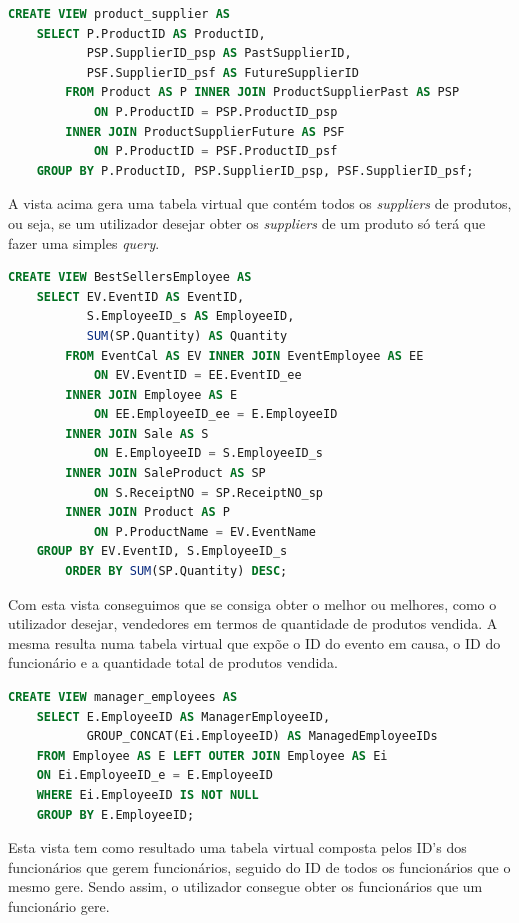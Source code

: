 \documentclass[a4paper,12pt]{scrreprt}
\begin{document}
\begin{lstlisting}[language=sql]
CREATE VIEW product_supplier AS
    SELECT P.ProductID AS ProductID, 
           PSP.SupplierID_psp AS PastSupplierID,
           PSF.SupplierID_psf AS FutureSupplierID
        FROM Product AS P INNER JOIN ProductSupplierPast AS PSP 
            ON P.ProductID = PSP.ProductID_psp
        INNER JOIN ProductSupplierFuture AS PSF
            ON P.ProductID = PSF.ProductID_psf
    GROUP BY P.ProductID, PSP.SupplierID_psp, PSF.SupplierID_psf;
\end{lstlisting}

A vista acima gera uma tabela virtual que contém todos os \textit{suppliers} de produtos, ou seja, se um utilizador desejar obter os \textit{suppliers} 
de um produto só terá que fazer uma simples \textit{query}.

\begin{lstlisting}[language=sql]
CREATE VIEW BestSellersEmployee AS
    SELECT EV.EventID AS EventID,
           S.EmployeeID_s AS EmployeeID,
           SUM(SP.Quantity) AS Quantity
        FROM EventCal AS EV INNER JOIN EventEmployee AS EE
            ON EV.EventID = EE.EventID_ee
        INNER JOIN Employee AS E
            ON EE.EmployeeID_ee = E.EmployeeID
        INNER JOIN Sale AS S
            ON E.EmployeeID = S.EmployeeID_s
        INNER JOIN SaleProduct AS SP
            ON S.ReceiptNO = SP.ReceiptNO_sp
        INNER JOIN Product AS P
            ON P.ProductName = EV.EventName
    GROUP BY EV.EventID, S.EmployeeID_s
        ORDER BY SUM(SP.Quantity) DESC;
\end{lstlisting}

Com esta vista conseguimos que se consiga obter o melhor ou melhores, como o utilizador desejar, vendedores em termos de quantidade 
de produtos vendida.
A mesma resulta numa tabela virtual que expõe o ID do evento em causa, o ID do funcionário e a quantidade total de produtos vendida.

\begin{lstlisting}[language=sql]
CREATE VIEW manager_employees AS
    SELECT E.EmployeeID AS ManagerEmployeeID,
           GROUP_CONCAT(Ei.EmployeeID) AS ManagedEmployeeIDs
    FROM Employee AS E LEFT OUTER JOIN Employee AS Ei
    ON Ei.EmployeeID_e = E.EmployeeID
    WHERE Ei.EmployeeID IS NOT NULL
    GROUP BY E.EmployeeID;    
\end{lstlisting}

Esta vista tem como resultado uma tabela virtual composta pelos ID's dos funcionários que gerem funcionários, seguido do ID de todos os funcionários que o mesmo gere.
Sendo assim, o utilizador consegue obter os funcionários que um funcionário gere.
\end{document}
